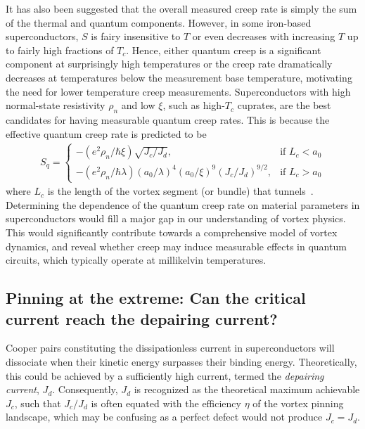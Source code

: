 \documentclass[%
 aip,
 amsmath,amssymb,
 reprint,%
floatfix]{revtex4-1}
\newcommand{\Tc}{T_{c}}
\newcommand{\Jc}{J_{c}}
\newcommand{\Jdp}{J_{d}}
\begin{document}
It has also been suggested that the overall measured creep rate is simply the sum of the thermal and quantum components.\cite{PhysRevB.64.094509}  However, in some iron-based superconductors,\cite{Haberkorn2012a, Haberkorn2014} $S$ is fairy insensitive to $T$ or even decreases with increasing $T$ up to fairly high fractions of $\Tc$. Hence, either quantum creep is a significant component at surprisingly high temperatures or the creep rate dramatically decreases at temperatures below the measurement base temperature, motivating the need for lower temperature creep measurements.   Superconductors with high normal-state resistivity $\rho_n$ and low $\xi$, such as high-$\Tc$ cuprates, are the best candidates for having measurable quantum creep rates.  This is because the effective quantum creep rate is predicted to be
%
\begin{align}
\!\!\!
S_q = 
\begin{cases}
   -(e^2 \rho_n / \hbar \xi) \sqrt{\Jc / \Jdp},& \!\!\!\!\text{if } L_c<a_0 \\
   -(e^2 \rho_n / \hbar \lambda)(a_0/\lambda)^4(a_0/\xi)^9(\Jc/\Jdp)^{9/2}, & \!\!\!\!\text{if } L_c > a_0
\end{cases}\!\!
\end{align}
%
where $L_c$ is the length of the vortex segment (or bundle) that tunnels~\cite{Blatter1994}.  Determining the dependence of the quantum creep rate on material parameters in superconductors would fill a major gap in our understanding of vortex physics. This would significantly contribute towards a comprehensive model of vortex dynamics, and reveal whether creep may induce measurable effects in quantum circuits, which typically operate at millikelvin temperatures. 



\subsection{Pinning at the extreme: Can the critical current reach the depairing current?\label{ssec:Jd}}

Cooper pairs constituting the dissipationless current in superconductors will dissociate when their kinetic energy surpasses their binding energy. Theoretically, this could be achieved by a sufficiently high current, termed the \textit{depairing current}, $\Jdp$. Consequently, $\Jdp$ is recognized as the theoretical maximum achievable $\Jc$, such that $\Jc/\Jdp$ is often equated with the efficiency $\eta$ of the vortex pinning landscape, which may be confusing as a perfect defect would not produce $\Jc=\Jdp$.\cite{Wimbush2015}
\end{document}
